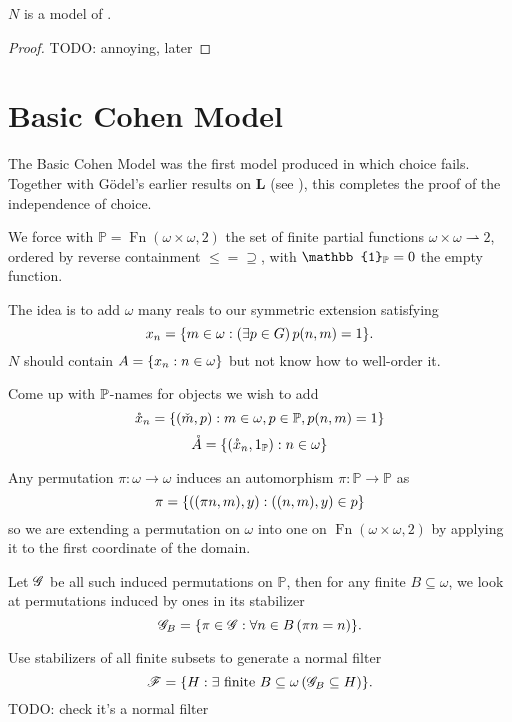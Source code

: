 \begin{theorem}
    \(N\) is a model of \ZF.
\end{theorem}
\begin{proof}
    TODO: annoying, later
\end{proof}

\section{Basic Cohen Model}

The Basic Cohen Model was the first model produced in which choice fails.
Together with Gödel's earlier results on \(\mathbf{L}\) (see ),
this completes the proof of the independence of choice.

We force with \(\mathbb{P} = \operatorname{Fn}(\omega\times\omega, 2)\)
the set of finite partial functions \(\omega\times\omega \rightharpoonup 2\),
ordered by reverse containment \(\leq = \supseteq\),
with \(\mathbb{1}_\P = 0\) the empty function.

The idea is to add \(\omega\) many reals to our symmetric extension satisfying
\begin{equation} \label{basicCohen:property_x_n}
    x_n = \set{m\in\omega: \left(\exists p\in G\right) p(n,m) = 1}.
\end{equation}
\(N\) should contain \( A = \set{x_n:n\in \omega } \) but not know how to well-order it.

Come up with \(\P\)-names for objects we wish to add
\[ \mathring{x}_n = \set{(\check{m},p): m\in\omega, p\in\P,p(n,m) = 1} \]
\[ \mathring{A} = \set{(\mathring{x}_n,1_\P): n\in\omega} \]


Any permutation \(\pi: \omega \to \omega\) induces an automorphism \(\pi: \mathbb{P}\to\mathbb{P}\) as
\[ \pi = \set{((\pi n, m), y): ((n,m),y) \in p} \]
so we are extending a permutation on \(\omega\) into one on \(\operatorname{Fn}(\omega\times\omega, 2)\)
by applying it to the first coordinate of the domain.

Let \(\G\) be all such induced permutations on \(\mathbb{P}\), then for any finite \(B\subseteq \omega\),
we look at permutations induced by ones in its stabilizer
\[ \G_B = \set{ \pi\in \G: \forall n\in B\left( \pi n = n \right) }. \]

Use stabilizers of all finite subsets to generate a normal filter
\[ \mathscr{F} = \set{H: \exists \text{ finite } B\subseteq \omega \left(\G_B \subseteq H\right) }. \]
TODO: check it's a normal filter

